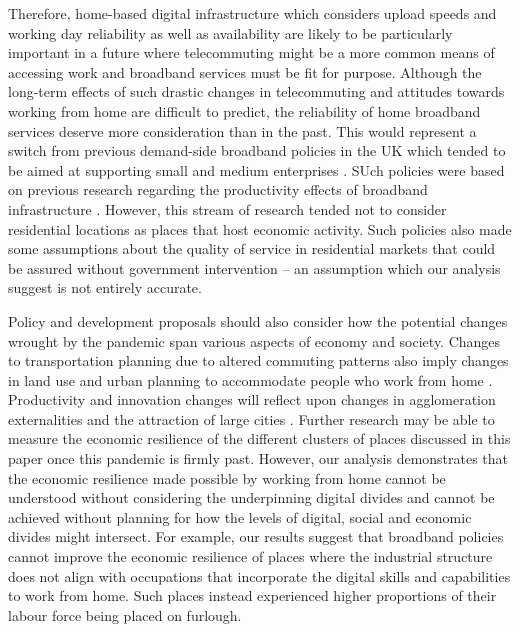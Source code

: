\documentclass[]{interact}
\theoremstyle{plain}%
\theoremstyle{definition}
\theoremstyle{remark}
\begin{document}
Therefore, home-based digital infrastructure which considers upload
speeds and working day reliability as well as availability are likely to
be particularly important in a future where telecommuting might be a
more common means of accessing work and broadband services must be fit
for purpose. Although the long-term effects of such drastic changes in
telecommuting and attitudes towards working from home are difficult to
predict, the reliability of home broadband services deserve more
consideration than in the past. This would represent a switch from
previous demand-side broadband policies in the UK which tended to be
aimed at supporting small and medium enterprises
\citep{HENDERSON2020102024}. SUch policies were based on previous
research regarding the productivity effects of broadband infrastructure
\citep{DESTEFANO2018110}. However, this stream of research tended not to
consider residential locations as places that host economic activity.
Such policies also made some assumptions about the quality of service in
residential markets that could be assured without government
intervention -- an assumption which our analysis suggest is not entirely
accurate.

Policy and development proposals should also consider how the potential
changes wrought by the pandemic span various aspects of economy and
society. Changes to transportation planning due to altered commuting
patterns also imply changes in land use and urban planning to
accommodate people who work from home
\citep{BUDNITZ2020102713, ELLDER2020102777}. Productivity and innovation
changes will reflect upon changes in agglomeration externalities and the
attraction of large cities \citep{econobs}. Further research may be able
to measure the economic resilience of the different clusters of places
discussed in this paper once this pandemic is firmly past. However, our
analysis demonstrates that the economic resilience made possible by
working from home cannot be understood without considering the
underpinning digital divides and cannot be achieved without planning for
how the levels of digital, social and economic divides might intersect.
For example, our results suggest that broadband policies cannot improve
the economic resilience of places where the industrial structure does
not align with occupations that incorporate the digital skills and
capabilities to work from home. Such places instead experienced higher
proportions of their labour force being placed on furlough.
\end{document}
